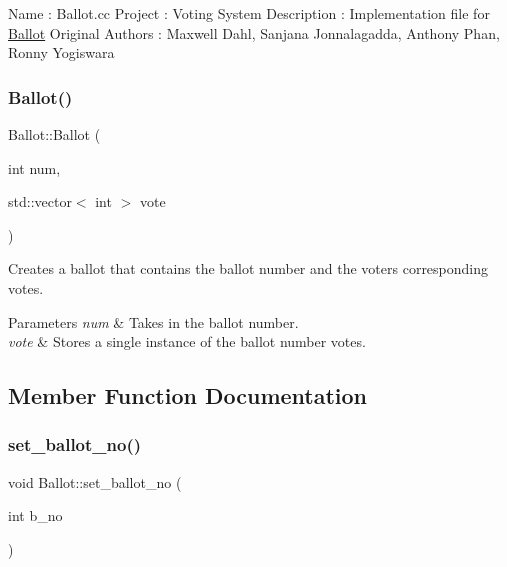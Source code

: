  Name \+: Ballot.\+cc Project \+: Voting System Description \+: Implementation file for \mbox{\hyperlink{class_ballot}{Ballot}} Original Authors \+: Maxwell Dahl, Sanjana Jonnalagadda, Anthony Phan, Ronny Yogiswara \mbox{\label{class_ballot_afdbfa652a622a1d5aad8ec911a29a91f}} 
\subsubsection{\texorpdfstring{Ballot()}{Ballot()}\hspace{0.1cm}{\footnotesize\ttfamily [2/2]}}
{\footnotesize\ttfamily Ballot\+::\+Ballot (\begin{DoxyParamCaption}\item[{int}]{num,  }\item[{std\+::vector$<$ int $>$}]{vote }\end{DoxyParamCaption})}



Creates a ballot that contains the ballot number and the voters corresponding votes. 


\begin{DoxyParams}{Parameters}
{\em num} & Takes in the ballot number.\\
\hline
{\em vote} & Stores a single instance of the ballot number votes. \\
\hline
\end{DoxyParams}


\subsection{Member Function Documentation}
\mbox{\label{class_ballot_a72f501296fc05e981791b5b380cc5152}} 
\subsubsection{\texorpdfstring{set\+\_\+ballot\+\_\+no()}{set\_ballot\_no()}}
{\footnotesize\ttfamily void Ballot\+::set\+\_\+ballot\+\_\+no (\begin{DoxyParamCaption}\item[{int}]{b\+\_\+no }\end{DoxyParamCaption})\hspace{0.3cm}{\ttfamily [inline]}}



